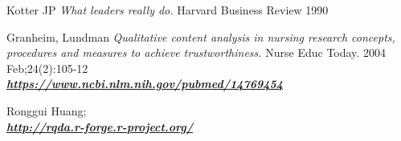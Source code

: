 \documentclass[12pt,a4paper,oneside]{article}
\begin{document}
\begin{thebibliography}{11}
Kotter JP \emph{What leaders really do.} Harvard Business Review 1990

Granheim, Lundman \emph{Qualitative content analysis in nursing research concepts, procedures and measures to achieve trustworthiness.} Nurse Educ Today. 2004 Feb;24(2):105-12 \\\textbf{\emph{\href{https://www.ncbi.nlm.nih.gov/pubmed/14769454}{\url{https://www.ncbi.nlm.nih.gov/pubmed/14769454}}}}


Ronggui Huang; \\\textbf{\emph{\href{http://rqda.r-forge.r-project.org/}{\url{http://rqda.r-forge.r-project.org/}}}}

\end{thebibliography} 
 
\end{document}
